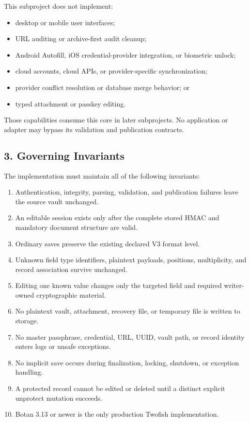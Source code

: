 \documentclass[
  letterpaper,
]{article}
\providecommand{\tightlist}{%
  \setlength{\itemsep}{0pt}\setlength{\parskip}{0pt}}
\begin{document}
This subproject does not implement:

\begin{itemize}
\tightlist
\item
  desktop or mobile user interfaces;
\item
  URL auditing or archive-first audit cleanup;
\item
  Android Autofill, iOS credential-provider integration, or biometric unlock;
\item
  cloud accounts, cloud APIs, or provider-specific synchronization;
\item
  provider conflict resolution or database merge behavior; or
\item
  typed attachment or passkey editing.
\end{itemize}

Those capabilities consume this core in later subprojects. No application or adapter may bypass its validation and
publication contracts.

\subsection{3. Governing Invariants}\label{3-governing-invariants}

The implementation must maintain all of the following invariants:

\begin{enumerate}
\def\labelenumi{\arabic{enumi}.}
\tightlist
\item
  Authentication, integrity, parsing, validation, and publication failures leave the source vault unchanged.
\item
  An editable session exists only after the complete stored HMAC and mandatory document structure are valid.
\item
  Ordinary saves preserve the existing declared V3 format level.
\item
  Unknown field type identifiers, plaintext payloads, positions, multiplicity, and record association survive unchanged.
\item
  Editing one known value changes only the targeted field and required writer-owned cryptographic material.
\item
  No plaintext vault, attachment, recovery file, or temporary file is written to storage.
\item
  No master passphrase, credential, URL, UUID, vault path, or record identity enters logs or unsafe exceptions.
\item
  No implicit save occurs during finalization, locking, shutdown, or exception handling.
\item
  A protected record cannot be edited or deleted until a distinct explicit unprotect mutation succeeds.
\item
  Botan 3.13 or newer is the only production Twofish implementation.
\end{enumerate}
\end{document}
